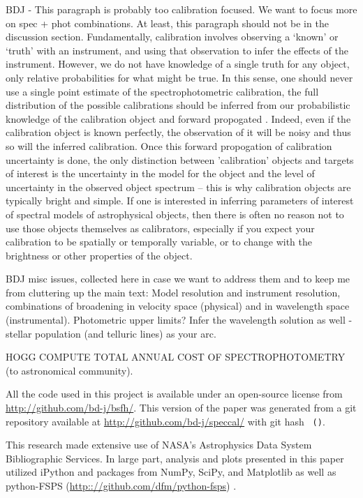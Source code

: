 \documentclass[iop,numberedappendix]{emulateapj}
\begin{document}
{\color{blue} BDJ - This paragraph is probably too calibration
focused. We want to focus more on spec + phot combinations.  At least,
this paragraph should not be in the discussion section.}
Fundamentally, calibration involves observing a `known' or `truth'
with an instrument, and using that observation to infer the effects of
the instrument.  However, we do not have knowledge of a single truth
for any object, only relative probabilities for what might be true.
In this sense, one should never use a single point estimate of the
spectrophotometric calibration, the full distribution of the possible
calibrations should be inferred from our probabilistic knowledge of
the calibration object and forward propogated
\citep[e.g.][]{lee11}. Indeed, even if the calibration object is known
perfectly, the observation of it will be noisy and thus so will the
inferred calibration. Once this forward propogation of calibration
uncertainty is done, the only distinction between 'calibration'
objects and targets of interest is the uncertainty in the model for
the object and the level of uncertainty in the observed object
spectrum -- this is why calibration objects are typically bright and
simple.  If one is interested in inferring parameters of interest of
spectral models of astrophysical objects, then there is often no
reason not to use those objects themselves as calibrators, especially
if you expect your calibration to be spatially or temporally variable,
or to change with the brightness or other properties of the object.

{\color{blue} BDJ misc issues, collected here in case we want to
address them and to keep me from cluttering up the main text:} Model
resolution and instrument resolution, combinations of broadening in
velocity space (physical) and in wavelength space (instrumental).
Photometric upper limits? Infer the wavelength solution as well -
stellar population (and telluric lines) as your arc.

HOGG COMPUTE TOTAL ANNUAL COST OF SPECTROPHOTOMETRY (to astronomical community).

All the code used in this project is available under an open-source license
  from \url{http://github.com/bd-j/bsfh/}.
This version of the paper was generated
  from a git repository available at \url{http://github.com/bd-j/speccal/}
  with git hash \texttt{\githash\,(\gitdate)}.

\acknowledgements
This research made extensive use of NASA's Astrophysics Data System Bibliographic Services. 
In large part, analysis and plots presented in this paper utilized
  iPython and packages from NumPy, SciPy, and Matplotlib
  \citep[][]{hunter2007, oliphant2007, perez2007} as well
  as python-FSPS  (\url{http:://github.com/dfm/python-fsps}) .
\end{document}
